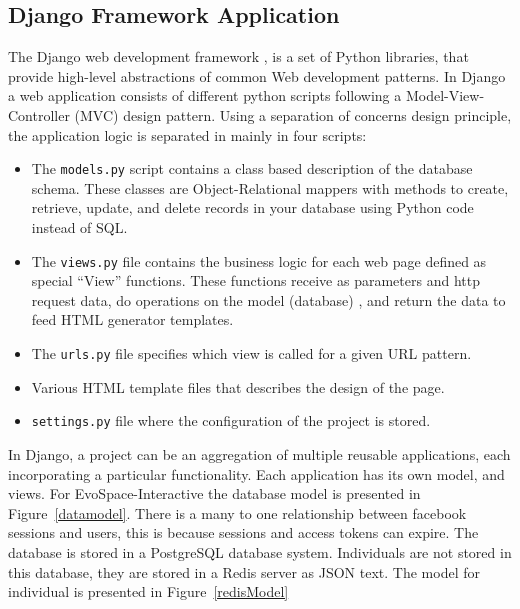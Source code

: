 \documentclass{sig-alternate}
\begin{document}
\subsection{Django Framework Application}
The Django web development framework \cite{django}, is a set of Python libraries, that provide high-level abstractions of common Web development patterns. In Django a web application consists of different python scripts following a Model-View-Controller (MVC) design pattern. Using a separation of concerns design principle, the application logic is separated in mainly in four scripts:
\begin{itemize}
	\item The \texttt{models.py} script contains a class based description of the database schema. These classes are Object-Relational mappers with methods to create, retrieve, update, and delete records in your database using Python code instead of SQL.
	\item The \texttt{views.py} file contains the business logic for each web page defined as special  ``View'' functions. These functions receive as parameters and http request data, do operations on the model (database) , and return the data to feed HTML generator templates.
	\item The \texttt{urls.py} file specifies which view is called for a given URL pattern.
    \item Various HTML template files that describes the design of the page.
    \item \texttt{settings.py} file where the configuration of the project is stored.
\end{itemize}

In Django, a project can be an aggregation of multiple reusable applications, each incorporating a particular functionality. Each application has its own model, and views. For EvoSpace-Interactive the database model is presented in Figure~\ref{datamodel}. There is a many to one relationship between facebook sessions and users, this is because sessions and access tokens can expire. The database is stored in a PostgreSQL database system. Individuals are not stored in this database, they are stored in a Redis server as JSON text. The model for individual is presented in Figure~\ref{redisModel}
\end{document}
